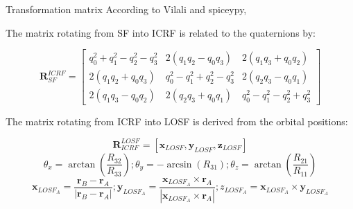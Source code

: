\documentclass[12pt,english,ignorenonframetext,]{beamer}
\begin{document}
\begin{frame}{Transformation matrix}
	According to Vilali and spiceypy, 
	\begin{block}{The matrix rotating from SF into ICRF is related to the quaternions by:}
		\begin{tiny}
		\begin{equation}
			\mathbf{R}_{S F}^{I C R F}=\left[\begin{array}{ccc}
			q_{0}^{2}+q_{1}^{2}-q_{2}^{2}-q_{3}^{2} & 2\left(q_{1} q_{2}-q_{0} q_{3}\right) & 2\left(q_{1} q_{3}+q_{0} q_{2}\right) \\
			2\left(q_{1} q_{2}+q_{0} q_{3}\right) & q_{0}^{2}-q_{1}^{2}+q_{2}^{2}-q_{3}^{2} & 2\left(q_{2} q_{3}-q_{0} q_{1}\right) \\
			2\left(q_{1} q_{3}-q_{0} q_{2}\right) & 2\left(q_{2} q_{3}+q_{0} q_{1}\right) & q_{0}^{2}-q_{1}^{2}-q_{2}^{2}+q_{3}^{2}
			\end{array}\right]
		\end{equation}
		\end{tiny}
	\end{block}

	\begin{block}{The matrix rotating from ICRF into LOSF is derived from the orbital positions:}
		\begin{tiny}
			\begin{equation}
			\mathbf{R}_{I C R F}^{L O S F}=\left[\boldsymbol{x}_{L O S F}, \boldsymbol{y}_{L O S F} , \boldsymbol{z}_{L O S F}\right]
			\end{equation}
			\begin{equation}
				\theta_{x}=\arctan (\frac{R_{32}}{R_{33}});
				\theta_{y}=-\arcsin (R_{31});
				\theta_{z}=\arctan (\frac{R_{21}}{R_{11}})
			\end{equation}
			\begin{equation}
				\boldsymbol{x}_{L O S F_{A}}=\frac{\boldsymbol{r}_{B}-\boldsymbol{r}_{A}}{\left|\boldsymbol{r}_{B}-\boldsymbol{r}_{A}\right|};
				\boldsymbol{y}_{L O S F_{A}}=\frac{\boldsymbol{x}_{L O S F_{A}} \times \boldsymbol{r}_{A}}{\left|\boldsymbol{x}_{L O S F_{A}} \times \boldsymbol{r}_{A}\right|};
				z_{L O S F_{A}}=\boldsymbol{x}_{L O S F_{A}} \times \boldsymbol{y}_{L O S F_{A}}
			\end{equation}
		\end{tiny}
	\end{block}
\end{frame}
\end{document}

